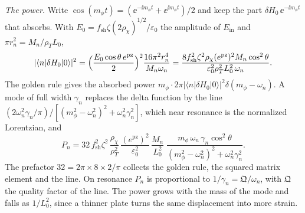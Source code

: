 \emph{The power.} Write $\cos(m_\phi t) = (\ee^{-\ii m_\phi t} + \ee^{\ii m_\phi t})/2$ and keep the part $\delta H_0\,\ee^{-\ii m_\phi t}$ that absorbs. With $E_0 = f_{\mathrm{sh}}\zeta(2\rho_\chi)^{1/2}/\varepsilon_0$ the amplitude of $E_{\mathrm{in}}$ and $\pi r_n^2 = M_n/\rho_TL_0$,
\begin{equation*}
  |\langle n|\delta H_0|0\rangle|^2 = \Bigl(\frac{E_0\cos\theta\,e^{\mathrm{pz}}}{2}\Bigr)^2\frac{16\pi^2r_n^4}{M_n\omega_n}
  = \frac{8f_{\mathrm{sh}}^2\zeta^2\rho_\chi(e^{\mathrm{pz}})^2M_n\cos^2\theta}{\varepsilon_0^2\rho_T^2L_0^2\,\omega_n} .
\end{equation*}
The golden rule gives the absorbed power $m_\phi \cdot 2\pi|\langle n|\delta H_0|0\rangle|^2\delta(m_\phi - \omega_n)$. A mode of full width $\gamma_n$ replaces the delta function by the line $(2\omega_n^2\gamma_n/\pi)/[(m_\phi^2 - \omega_n^2)^2 + \omega_n^2\gamma_n^2]$, which near resonance is the normalized Lorentzian, and
\begin{equation}
  P_n = 32\,f_{\mathrm{sh}}^2\zeta^2\,\frac{\rho_\chi}{\rho_T^2}\,\frac{(e^{\mathrm{pz}})^2}{\varepsilon_0^2}\,\frac{M_n}{L_0^2}\;
  \frac{m_\phi\,\omega_n\,\gamma_n\cos^2\theta}{(m_\phi^2 - \omega_n^2)^2 + \omega_n^2\gamma_n^2} .
  \label{eq:11.8-Pn}
\end{equation}
The prefactor $32 = 2\pi \times 8 \times 2/\pi$ collects the golden rule, the squared matrix element and the line. On resonance $P_n$ is proportional to $1/\gamma_n = \mathfrak{Q}/\omega_n$, with $\mathfrak{Q}$ the quality factor of the line. The power grows with the mass of the mode and falls as $1/L_0^2$, since a thinner plate turns the same displacement into more strain.

